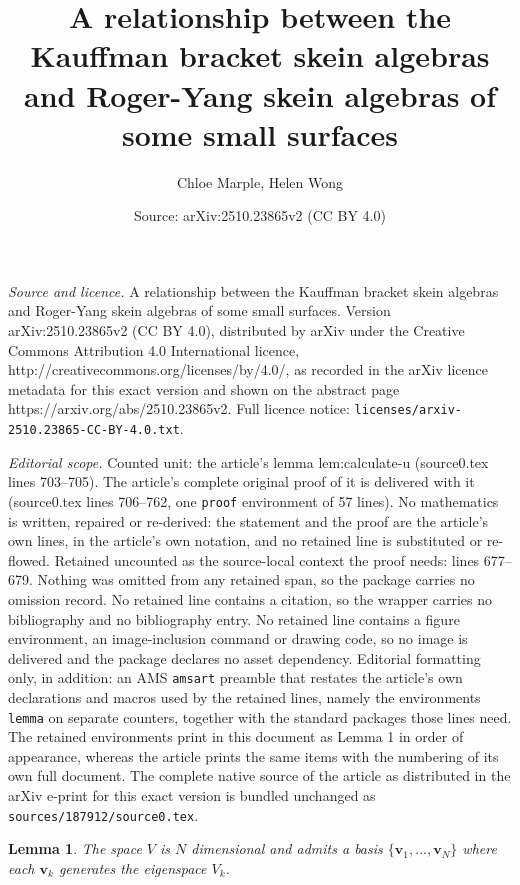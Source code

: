 \documentclass[10pt,a4paper]{amsart}
\title{A relationship between the Kauffman bracket skein algebras and Roger-Yang skein algebras of some small surfaces}
\author{Chloe Marple, Helen Wong}
\date{Source: arXiv:2510.23865v2 (CC BY 4.0)}
\newtheorem{lemma}{Lemma}
\renewcommand{\v}{\mathbf{v}}
\begin{document}
\maketitle

\noindent\emph{Source and licence.} A relationship between the Kauffman bracket skein algebras and Roger-Yang skein algebras of some small surfaces. Version arXiv:2510.23865v2 (CC BY 4.0), distributed by arXiv under the Creative Commons Attribution 4.0 International licence, http://creativecommons.org/licenses/by/4.0/, as recorded in the arXiv licence metadata for this exact version and shown on the abstract page https://arxiv.org/abs/2510.23865v2. Full licence notice: \texttt{licenses/arxiv-2510.23865-CC-BY-4.0.txt}.\par\smallskip

\noindent\textit{Editorial scope.} Counted unit: the article's lemma lem:calculate-u (source0.tex lines 703--705). The article's complete original proof of it is delivered with it (source0.tex lines 706--762, one \texttt{proof} environment of 57 lines). No mathematics is written, repaired or re-derived: the statement and the proof are the article's own lines, in the article's own notation, and no retained line is substituted or re-flowed.  Retained uncounted as the source-local context the proof needs: lines 677--679.  Nothing was omitted from any retained span, so the package carries no omission record.  No retained line contains a citation, so the wrapper carries no bibliography and no bibliography entry.  No retained line contains a figure environment, an image-inclusion command or drawing code, so no image is delivered and the package declares no asset dependency.  Editorial formatting only, in addition: an AMS \texttt{amsart} preamble that restates the article's own declarations and macros used by the retained lines, namely the environments \texttt{lemma} on separate counters, together with the standard packages those lines need.  The retained environments print in this document as Lemma 1 in order of appearance, whereas the article prints the same items with the numbering of its own full document.  The complete native source of the article as distributed in the arXiv e-print for this exact version is bundled unchanged as \texttt{sources/187912/source0.tex}.
\begin{lemma}\label{lem:eigenspace}
The space $V$ is $N$ dimensional and admits a basis $\{\v_1,\ldots,\v_N\}$ where each $\v_k$ generates the eigenspace $V_k$.
\end{lemma}
\end{document}
